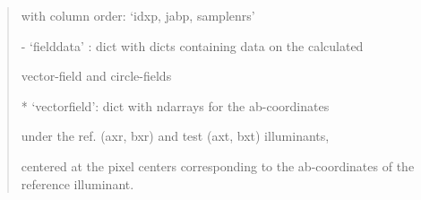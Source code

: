 \documentclass[letterpaper,10pt,english]{sphinxmanual}
\begin{document}
\begin{fulllineitems}
\begin{description}
\begin{quote}
\begin{description}
\begin{DUlineblock}{0em}
\begin{DUlineblock}{\DUlineblockindent}
\begin{DUlineblock}{\DUlineblockindent}
\begin{DUlineblock}{\DUlineblockindent}
\begin{DUlineblock}{\DUlineblockindent}
\item[] with column order: ‘idxp, jabp, samplenrs’
\end{DUlineblock}
\end{DUlineblock}
\end{DUlineblock}
\item[] - ‘fielddata’ : dict with dicts containing data on the calculated 
\item[]
\begin{DUlineblock}{\DUlineblockindent}
\item[]
\begin{DUlineblock}{\DUlineblockindent}
\item[] vector-field and circle-fields 
\end{DUlineblock}
\item[] * ‘vectorfield’: dict with ndarrays for the ab-coordinates 
\item[]
\begin{DUlineblock}{\DUlineblockindent}
\item[] under the ref. (axr, bxr) and test (axt, bxt) illuminants,
\item[] centered at the pixel centers corresponding to the 
ab-coordinates of the reference illuminant.
\end{DUlineblock}
\end{DUlineblock}
\end{DUlineblock}
\end{DUlineblock}

\end{description}\end{quote}

\end{description}

\end{fulllineitems}
\end{document}
